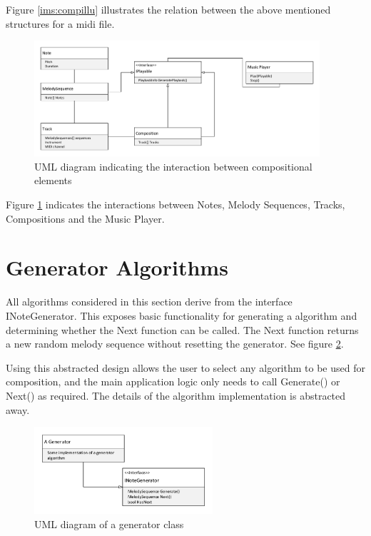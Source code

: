 Figure \ref{ims:compillu} illustrates the relation between the above mentioned structures for a midi file.

\begin{figure}
\centerline{\includegraphics[width=400px]{../images/uml_notes.pdf}}
\caption{UML diagram indicating the interaction between compositional elements}
\label{ims:uml_notes}
\end{figure}

Figure \ref{ims:uml_notes} indicates the interactions between Notes, Melody Sequences, Tracks, Compositions and the Music Player.

\section{Generator Algorithms}
All algorithms considered in this section derive from the interface INoteGenerator. This exposes basic functionality for generating a algorithm and determining whether the Next function can be called. The Next function returns a new random melody sequence without resetting the generator. See figure \ref{ims:uml_generator}.

Using this abstracted design allows the user to select any algorithm to be used for composition, and the main application logic only needs to call Generate() or Next() as required. The details of the algorithm implementation is abstracted away.

\begin{figure}
\centerline{\includegraphics[width=250px]{../images/uml_generator.pdf}}
\caption{UML diagram of a generator class}
\label{ims:uml_generator}
\end{figure}

